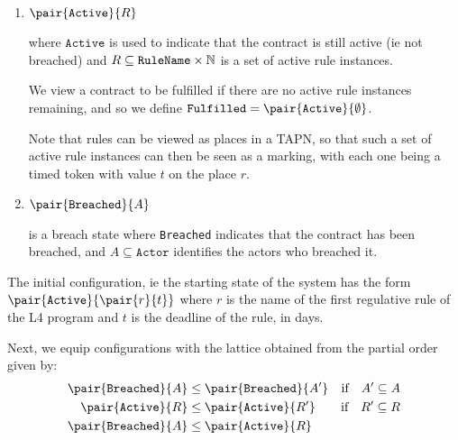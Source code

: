 \documentclass{article}
\begin{document}
\begin{enumerate}
  \item
  $\pair{\texttt{Active}}{R}$
  
  where $\texttt{Active}$ is used to indicate that the contract is still active
  (ie not breached) and
  $R \subseteq \texttt{RuleName} \times \operatorname{\mathbb{N}}$
  is a set of active rule instances.

  We view a contract to be fulfilled if there are no active rule instances
  remaining, and so we define
  $\texttt{Fulfilled} = \pair{\texttt{Active}}{\emptyset}$.

  Note that rules can be viewed as places in a TAPN, so that such a set of
  active rule instances can then be seen as a marking, with each one being a
  timed token with value $t$ on the place $r$.




  \item
  $\pair{\texttt{Breached}}{A}$

  is a breach state where \texttt{Breached} indicates that the contract has
  been breached, and $A \subseteq \texttt{Actor}$ identifies the actors who
  breached it.
\end{enumerate}

The initial configuration, ie the starting state of the system has the form
$\pair{\texttt{Active}}{\pair{r}{t}}$
where $r$ is the name of the first regulative rule of the L4 program and $t$ is
the deadline of the rule, in days.

Next, we equip configurations with the lattice obtained from the partial order
given by:
\begin{align*}
    \pair{\texttt{Breached}}{A} & \leq
    \pair{\texttt{Breached}}{A'}
    & \text{if} \quad A' \subseteq A
    \\
    \pair{\texttt{Active}}{R} & \leq
    \pair{\texttt{Active}}{R'}
    & \text{if} \quad R' \subseteq R
    \\ 
    \pair{\texttt{Breached}}{A} & \leq
    \pair{\texttt{Active}}{R}
\end{align*}
\end{document}
